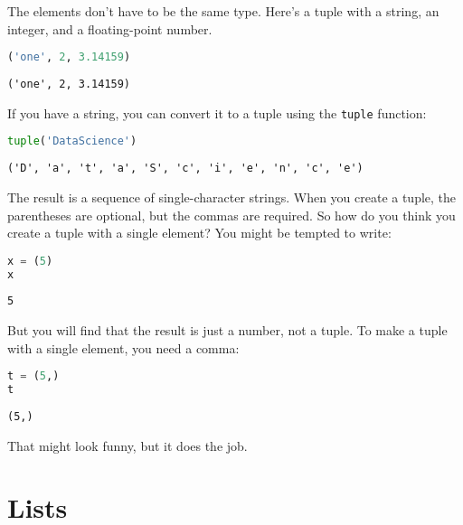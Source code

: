 The elements don't have to be the same type. Here's a tuple with a
string, an integer, and a floating-point number.

\begin{lstlisting}[language=Python,style=source]
('one', 2, 3.14159)
\end{lstlisting}

\begin{lstlisting}[style=output]
('one', 2, 3.14159)
\end{lstlisting}

If you have a string, you can convert it to a tuple using the
\passthrough{\lstinline!tuple!} function:

\begin{lstlisting}[language=Python,style=source]
tuple('DataScience')
\end{lstlisting}

\begin{lstlisting}[style=output]
('D', 'a', 't', 'a', 'S', 'c', 'i', 'e', 'n', 'c', 'e')
\end{lstlisting}

The result is a sequence of single-character strings. When you create a
tuple, the parentheses are optional, but the commas are required. So how
do you think you create a tuple with a single element? You might be
tempted to write:

\begin{lstlisting}[language=Python,style=source]
x = (5)
x
\end{lstlisting}

\begin{lstlisting}[style=output]
5
\end{lstlisting}

But you will find that the result is just a number, not a tuple. To make
a tuple with a single element, you need a comma:

\begin{lstlisting}[language=Python,style=source]
t = (5,)
t
\end{lstlisting}

\begin{lstlisting}[style=output]
(5,)
\end{lstlisting}

That might look funny, but it does the job.

\hypertarget{lists}{%
\section{Lists}\label{lists}}

